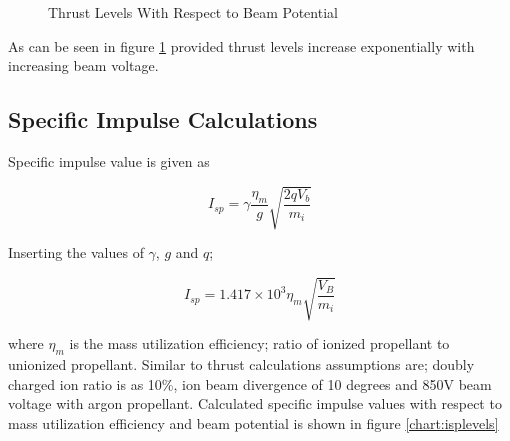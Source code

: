 \begin{figure}[ht]
\centering   
{}
    \caption{Thrust Levels With Respect to Beam Potential}
    \label{chart:thrustlevels}
\end{figure}

As can be seen in figure \ref{chart:thrustlevels} provided thrust levels increase exponentially with increasing beam voltage. 

\newpage
\subsection{Specific Impulse Calculations}

Specific impulse value is given as 

\begin{equation}
    I_{sp} = \gamma \frac{\eta_m}{g} \sqrt{\frac{2qV_b}{m_i}}
\end{equation}

Inserting the values of $\gamma$, $g$ and $q$;

\begin{equation}
    I_{sp} = 1.417 \times 10^3 \eta_m \sqrt{\frac{V_B}{m_i}}
\end{equation}

where $\eta_m$ is the mass utilization efficiency; ratio of ionized propellant to unionized propellant. Similar to thrust calculations assumptions are; doubly charged ion ratio is  as 10\%, ion beam divergence of 10 degrees and 850V beam voltage with argon propellant. Calculated specific impulse values with respect to mass utilization efficiency and beam potential is shown in figure \ref{chart:isplevels}

